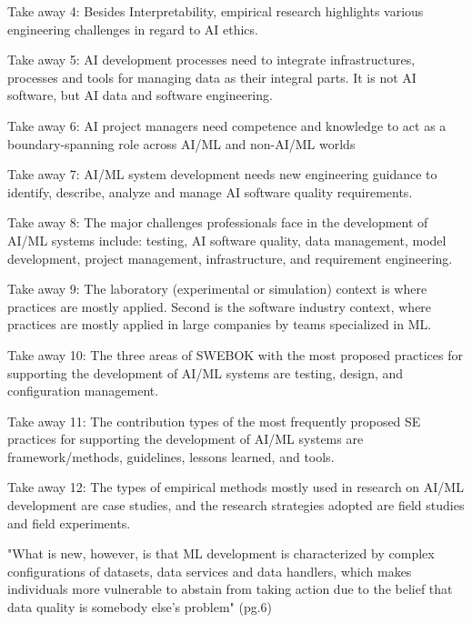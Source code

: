 Take away 4: Besides Interpretability, empirical research highlights various
engineering challenges in regard to AI ethics.

Take away 5: AI development processes need to integrate infrastructures,
processes and tools for managing data as their integral parts. It is not AI
software, but AI data and software engineering.

Take away 6: AI project managers need competence and knowledge to act as a
boundary-spanning role across AI/ML and non-AI/ML worlds

Take away 7: AI/ML system development needs new engineering guidance to
identify, describe, analyze and manage AI software quality requirements.

Take away 8: The major challenges professionals face in the development of AI/ML
systems include: testing, AI software quality, data management, model
development, project management, infrastructure, and requirement engineering.

Take away 9: The laboratory (experimental or simulation) context is where
practices are mostly applied. Second is the software industry context, where
practices are mostly applied in large companies by teams specialized in ML.

Take away 10: The three areas of SWEBOK with the most proposed practices for
supporting the development of AI/ML systems are testing, design, and
configuration management.

Take away 11: The contribution types of the most frequently proposed SE
practices for supporting the development of AI/ML systems are framework/methods,
guidelines, lessons learned, and tools.

Take away 12: The types of empirical methods mostly used in research on AI/ML
development are case studies, and the research strategies adopted are field
studies and field experiments.


\parencite{Priestley2023APipelines}


"What is new, however, is that ML development is characterized by complex
configurations of datasets, data services and data handlers, which makes
individuals more vulnerable to abstain from taking action due to the belief
that data quality is somebody else’s problem" (pg.6)

